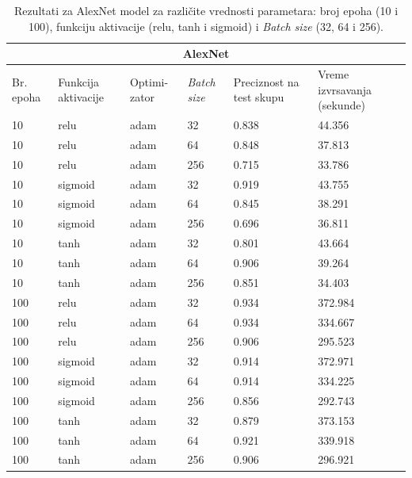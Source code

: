 \documentclass[a4paper]{article}
\begin{document}
\begin{table}[h!]
\begin{center}
\caption{Rezultati za AlexNet model za različite vrednosti parametara: broj epoha (10 i 100), funkciju aktivacije (relu, tanh i sigmoid) i \textit{Batch size} (32, 64 i 256).}

\begin{tabular}{ |p{1cm}||p{1.5cm}|p{1.5cm}|p{1cm}|p{1.5cm}|p{1.5cm}| }
 \hline
 \multicolumn{6}{|c|}{AlexNet} \\
 \hline
 Br. epoha & Funkcija aktivacije & Optimi-zator & \textit{Batch size} & Preciznost na test skupu & Vreme izvrsavanja (sekunde)\\
 \hline
 10  & relu    & adam & 32  & 0.838  &  44.356 \\
 10  & relu    & adam & 64  & 0.848  & 37.813  \\
 10  & relu    & adam & 256 & 0.715  & 33.786  \\
 10  & sigmoid & adam & 32  & 0.919 &  43.755 \\
 10  & sigmoid & adam & 64  & 0.845  & 38.291  \\
 10  & sigmoid & adam & 256 & 0.696 & 36.811  \\
 10  & tanh    & adam & 32  & 0.801  & 43.664  \\
 10  & tanh    & adam & 64  & 0.906  & 39.264  \\
 10  & tanh    & adam & 256 & 0.851  & 34.403  \\
 
 100 & relu    & adam  & 32  & 0.934  & 372.984  \\
 100 & relu    & adam  & 64  & 0.934  & 334.667  \\
 100 & relu    & adam  & 256 & 0.906 & 295.523  \\ 
 100 & sigmoid & adam  & 32  & 0.914 & 372.971  \\
 100 & sigmoid & adam  & 64  & 0.914 & 334.225  \\
 100 & sigmoid & adam  & 256 & 0.856 & 292.743  \\
 100 & tanh    & adam  & 32  & 0.879  & 373.153  \\
 100 & tanh    & adam  & 64  & 0.921  &  339.918 \\
 100 & tanh    & adam  & 256 & 0.906  & 296.921  \\

 \hline
\end{tabular}
\label{tabela_alexnet}
\end{center}
\end{table}
\end{document}
